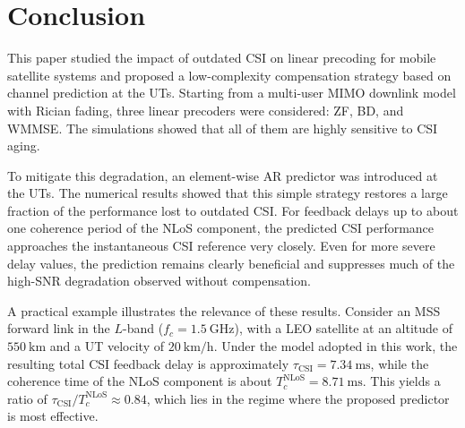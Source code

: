 \documentclass[conference]{IEEEtran}
\begin{document}
\section{Conclusion}
\label{section:conclusion}

This paper studied the impact of outdated \ac{CSI} on linear precoding for mobile satellite systems and proposed a low-complexity compensation strategy based on channel prediction at the \acp{UT}.
Starting from a multi-user \ac{MIMO} downlink model with Rician fading, three linear precoders were considered: \ac{ZF}, \ac{BD}, and \ac{WMMSE}.
The simulations showed that all of them are highly sensitive to \ac{CSI} aging.

To mitigate this degradation, an element-wise \ac{AR} predictor was introduced at the \acp{UT}.
The numerical results showed that this simple strategy restores a large fraction of the performance lost to outdated \ac{CSI}.
For feedback delays up to about one coherence period of the \ac{NLoS} component, the predicted \ac{CSI} performance approaches the instantaneous \ac{CSI} reference very closely.
Even for more severe delay values, the prediction remains clearly beneficial and suppresses much of the high-\ac{SNR} degradation observed without compensation.

A practical example illustrates the relevance of these results.
Consider an \ac{MSS} forward link in the $L$-band ($f_c = 1.5~\mathrm{GHz}$), with a \acs{LEO} satellite at an altitude of $550~\mathrm{km}$ and a \ac{UT} velocity of $20~\mathrm{km/h}$.
Under the model adopted in this work, the resulting total \ac{CSI} feedback delay is approximately $\tau_{\mathrm{CSI}} = 7.34~\mathrm{ms}$, while the coherence time of the \ac{NLoS} component is about $T_c^{\mathrm{NLoS}} = 8.71~\mathrm{ms}$.
This yields a ratio of $\tau_{\mathrm{CSI}}/T_c^{\mathrm{NLoS}} \approx 0.84$, which lies in the regime where the proposed predictor is most effective.



\end{document}
